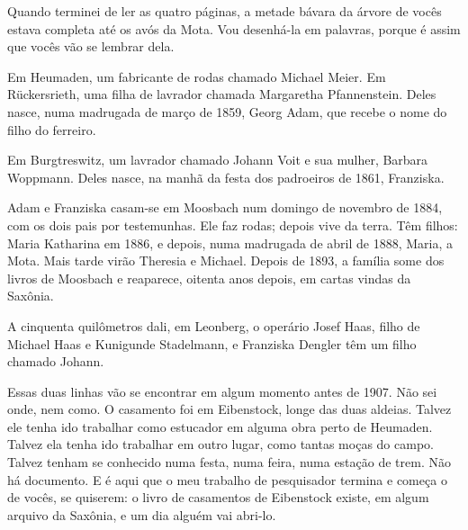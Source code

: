 \documentclass[
  brazilian,
  11pt,
  openany]{book}
\begin{document}
Quando terminei de ler as quatro páginas, a metade bávara da árvore de
vocês estava completa até os avós da Mota. Vou desenhá-la em palavras,
porque é assim que vocês vão se lembrar dela.

Em Heumaden, um fabricante de rodas chamado Michael Meier. Em
Rückersrieth, uma filha de lavrador chamada Margaretha Pfannenstein.
Deles nasce, numa madrugada de março de 1859, Georg Adam, que recebe o
nome do filho do ferreiro.

Em Burgtreswitz, um lavrador chamado Johann Voit e sua mulher, Barbara
Woppmann. Deles nasce, na manhã da festa dos padroeiros de 1861,
Franziska.

Adam e Franziska casam-se em Moosbach num domingo de novembro de 1884,
com os dois pais por testemunhas. Ele faz rodas; depois vive da terra.
Têm filhos: Maria Katharina em 1886, e depois, numa madrugada de abril
de 1888, Maria, a Mota. Mais tarde virão Theresia e Michael. Depois de
1893, a família some dos livros de Moosbach e reaparece, oitenta anos
depois, em cartas vindas da Saxônia.

A cinquenta quilômetros dali, em Leonberg, o operário Josef Haas, filho
de Michael Haas e Kunigunde Stadelmann, e Franziska Dengler têm um filho
chamado Johann.

Essas duas linhas vão se encontrar em algum momento antes de 1907. Não
sei onde, nem como. O casamento foi em Eibenstock, longe das duas
aldeias. Talvez ele tenha ido trabalhar como estucador em alguma obra
perto de Heumaden. Talvez ela tenha ido trabalhar em outro lugar, como
tantas moças do campo. Talvez tenham se conhecido numa festa, numa
feira, numa estação de trem. Não há documento. E é aqui que o meu
trabalho de pesquisador termina e começa o de vocês, se quiserem: o
livro de casamentos de Eibenstock existe, em algum arquivo da Saxônia, e
um dia alguém vai abri-lo.
\end{document}
